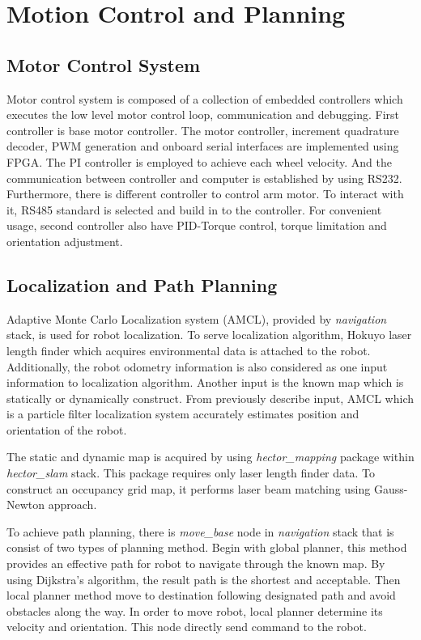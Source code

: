 \documentclass{llncs}
\begin{document}
\section{Motion Control and Planning}

\subsection{Motor Control System}

Motor control system is composed of a collection of embedded controllers which executes the low level motor control loop, communication and debugging. First controller is base motor controller. The motor controller, increment quadrature decoder, PWM generation and onboard serial interfaces are implemented using FPGA. The PI controller is employed to achieve each wheel velocity. And the communication between controller and computer is established by using RS232. Furthermore, there is different controller to control arm motor. To interact with it, RS485 standard is selected and build in to the controller. For convenient usage, second controller also have PID-Torque control, torque limitation and orientation adjustment. 

\subsection{Localization and Path Planning}

Adaptive Monte Carlo Localization system (AMCL), provided by \textit{navigation} stack, is used for robot localization. To serve localization algorithm, Hokuyo laser length finder which acquires environmental data is attached to the robot. Additionally, the robot odometry information is also considered as one input information to localization algorithm. Another input is the known map which is statically or dynamically construct. From previously describe input, AMCL which is a particle filter localization system accurately estimates position and orientation of the robot.

The static and dynamic map is acquired by using \textit{hector\_mapping} package within \textit{hector\_slam} stack. This package requires only laser length finder data. To construct an occupancy grid map, it performs laser beam matching using Gauss-Newton approach\cite{hector_slam}.

To achieve path planning, there is \textit{move\_base} node in \textit{navigation} stack that is consist of two types of planning method. Begin with global planner, this method provides an effective path for robot to navigate through the known map. By using Dijkstra's algorithm, the result path is the shortest and acceptable. Then local planner method move to destination following designated path and avoid obstacles along the way. In order to move robot, local planner determine its velocity and orientation. This node directly send command to the robot.
\end{document}
